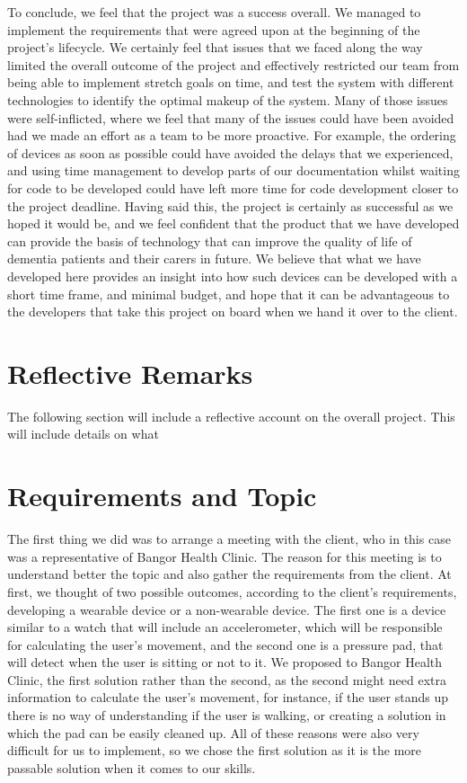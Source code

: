             To conclude, we feel that the project was a success overall. We managed to implement the requirements that were agreed upon at the beginning of the project's lifecycle. We certainly feel that issues that we faced along the way limited the overall outcome of the project and effectively restricted our team from being able to implement stretch goals on time, and test the system with different technologies to identify the optimal makeup of the system. Many of those issues were self-inflicted, where we feel that many of the issues could have been avoided had we made an effort as a team to be more proactive. For example, the ordering of devices as soon as possible could have avoided the delays that we experienced, and using time management to develop parts of our documentation whilst waiting for code to be developed could have left more time for code development closer to the project deadline. Having said this, the project is certainly as successful as we hoped it would be, and we feel confident that the product that we have developed can provide the basis of technology that can improve the quality of life of dementia patients and their carers in future. We believe that what we have developed here provides an insight into how such devices can be developed with a short time frame, and minimal budget, and hope that it can be advantageous to the developers that take this project on board when we hand it over to the client.

    
    \section{Reflective Remarks}

        The following section will include a reflective account on the overall project. This will include details on what

    \section{Requirements and Topic}
    \label{sec:reqs}

    The first thing we did was to arrange a meeting with the client, who in this case was a representative of Bangor Health Clinic. The reason for this meeting is to understand better the topic and also gather the requirements from the client. At first, we thought of two possible outcomes, according to the client's requirements, developing a wearable device or a non-wearable device. The first one is a device similar to a watch that will include an accelerometer, which will be responsible for calculating the user's movement, and the second one is a pressure pad, that will detect when the user is sitting or not to it. We proposed to Bangor Health Clinic, the first solution rather than the second, as the second might need extra information to calculate the user's movement, for instance, if the user stands up there is no way of understanding if the user is walking, or creating a solution in which the pad can be easily cleaned up. All of these reasons were also very difficult for us to implement, so we chose the first solution as it is the more passable solution when it comes to our skills.

